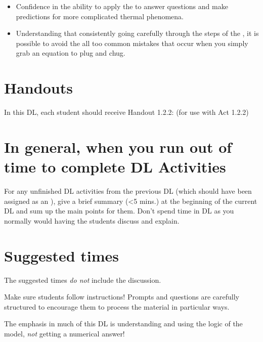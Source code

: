 \begin{itemize}
	\item Confidence in the ability to apply the \EnergyInteractionModel{} to answer questions and make predictions for more complicated thermal phenomena.
	\item Understanding that consistently going carefully through the steps of the \EnergyInteractionModel{}, it is possible to avoid the all too common mistakes that occur when you simply grab an equation to plug and chug.
\end{itemize}

\section*{Handouts}

In this DL, each student should receive Handout 1.2.2:  (for use with Act 1.2.2)

\section*{In general, when you run out of time to complete DL Activities}
	
	For any unfinished DL activities from the previous DL (which should have been assigned as an \FNT), give a brief summary (\textless 5 mins.) at the beginning of the current DL and sum up the main points for them. Don't spend time in DL as you normally would having the students discuss and explain.
	
\section*{Suggested times}
	
The suggested times {\em do not} include the \WC{} discussion.

\vspace*{1cm}
Make sure students follow instructions! Prompts and questions are carefully structured to encourage them to process the material in particular ways.

\vspace*{1cm}
\begin{mdframed}
The emphasis in much of this DL is understanding and using the logic of the model, {\em not} getting a numerical answer!
\end{mdframed}